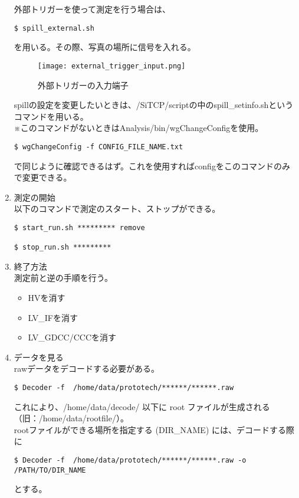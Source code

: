 \begin{enumerate}
外部トリガーを使って測定を行う場合は、
\begin{screen}
\begin{verbatim}
$ spill_external.sh
\end{verbatim}
\end{screen}
を用いる。その際、写真の場所に信号を入れる。

\begin{figure}[H]
\begin{center}
\texttt{[image: external\_trigger\_input.png]}
\end{center}
\caption{外部トリガーの入力端子}
\label{fig:}
\end{figure}

spillの設定を変更したいときは、/SiTCP/scriptの中のspill\_setinfo.shというコマンドを用いる。\\
※このコマンドがないときはAnalysis/bin/wgChangeConfigを使用。
\begin{screen}
\begin{verbatim}
$ wgChangeConfig -f CONFIG_FILE_NAME.txt
\end{verbatim}
\end{screen}
で同じように確認できるはず。これを使用すればconfigをこのコマンドのみで変更できる。

\item 測定の開始\\
以下のコマンドで測定のスタート、ストップができる。
\begin{screen}
\begin{verbatim}
$ start_run.sh ********* remove

$ stop_run.sh *********
\end{verbatim}
\end{screen}

\item 終了方法\\
測定前と逆の手順を行う。
\begin{itemize}
\item HVを消す
\item LV\_IFを消す
\item LV\_GDCC/CCCを消す
\end{itemize}

\item データを見る\\
rawデータをデコードする必要がある。
\begin{screen}
\begin{verbatim}
$ Decoder -f  /home/data/prototech/******/******.raw
\end{verbatim}
\end{screen}
これにより、/home/data/decode/ 以下に root ファイルが生成される（旧：/home/data/rootfile/）。\\
rootファイルができる場所を指定する (DIR\_NAME) には、デコードする際に
\begin{screen}
\begin{verbatim}
$ Decoder -f  /home/data/prototech/******/******.raw -o /PATH/TO/DIR_NAME
\end{verbatim}
\end{screen}
とする。\\


\end{enumerate}
